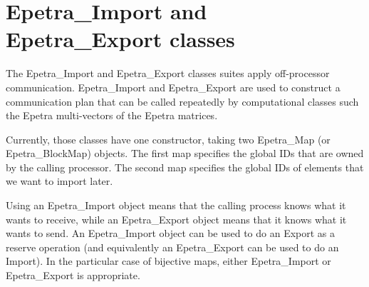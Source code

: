 
\section{Epetra\_Import and Epetra\_Export classes}
\label{sec:import_export}

The Epetra\_Import and Epetra\_Export classes suites apply off-processor
communication. Epetra\_Import and Epetra\_Export are used to construct a
communication plan that can be called repeatedly by computational
classes such the Epetra multi-vectors of the Epetra matrices.

Currently, those classes have one constructor, taking two Epetra\_Map
(or Epetra\_BlockMap) objects. The first map specifies the global IDs
that are owned by the calling processor. The second map specifies the
global IDs of elements that we want to import later.

Using an Epetra\_Import object means that the calling process knows what
it wants to receive, while an Epetra\_Export object means that it knows
what it wants to send. An Epetra\_Import object can be used to do an
Export as a reserve operation (and equivalently an Epetra\_Export can be
used to do an Import). In the particular case of bijective maps, either
Epetra\_Import or Epetra\_Export is appropriate.

\medskip

